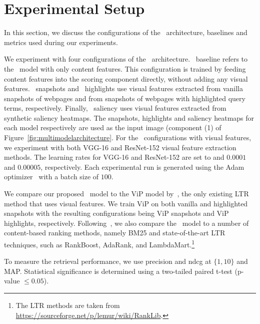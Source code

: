 
\section{Experimental Setup}\label{sec:setup}
In this section, we discuss the configurations of the \modelname~architecture, baselines and metrics used during our experiments.
%

We experiment with four configurations of the \modelname~architecture.
\modelname~baseline refers to the \modelname~model with only content features.
This configuration is trained by feeding content features into the scoring component directly, without adding any visual features.
\modelname~snapshots and \modelname~highlights use visual features extracted from vanilla snapshots of webpages and from snapshots of webpages with highlighted query terms, respectively.
Finally, \modelname~saliency uses visual features extracted from synthetic saliency heatmaps. The snapshots, highlights and saliency heatmaps for each model respectively are used as the input image (component (1) of Figure~\ref{fig:multimodelarchitecture}.
For the \modelname~configurations with visual features, we experiment with both VGG-16 and ResNet-152 visual feature extraction methods.
The learning rates for VGG-16 and ResNet-152 are set to and $0.0001$ and $0.00005$, respectively. 
Each experimental run is generated using the Adam optimizer~\cite{kingma2014adam} with a batch size of $100$.


We compare our proposed \modelname~model to the ViP model by~\citet{fan2017learning}, the only existing \ac{LTR} method that uses visual features.
We train ViP on both vanilla and highlighted snapshots with the resulting configurations being ViP snapshots and ViP highlights, respectively.
Following~\cite{fan2017learning}, we also compare the \modelname~model to a number of content-based ranking methods,
namely BM25 and state-of-the-art \ac{LTR} techniques, such as RankBoost, AdaRank, and LambdaMart.\footnote{The \ac{LTR} methods are taken from \url{https://sourceforge.net/p/lemur/wiki/RankLib}.}

To measure the retrieval performance, we use precision and ndcg at $\{1,10\}$ and MAP.
Statistical significance is determined using a two-tailed paired t-test (p-value $\leq 0.05$). 

